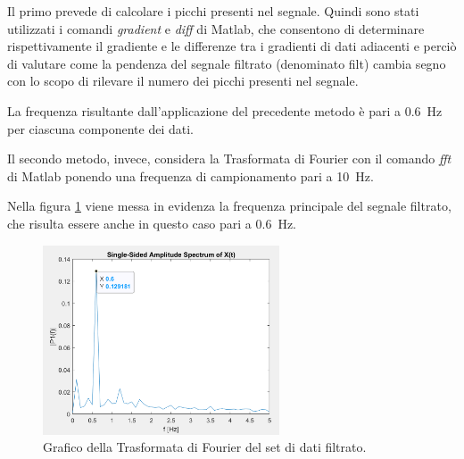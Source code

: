 Il primo prevede di calcolare i picchi presenti nel segnale. Quindi sono stati utilizzati i comandi \textit{gradient} e \textit{diff} di Matlab, che consentono di determinare rispettivamente il gradiente e le differenze tra i gradienti di dati adiacenti e perciò di valutare come la pendenza del segnale filtrato (denominato filt) cambia segno con lo scopo di rilevare il numero dei picchi presenti nel segnale.


La frequenza risultante dall'applicazione del precedente metodo è pari a \SI{0.6}{\hertz} per ciascuna componente dei dati.

Il secondo metodo, invece, considera la Trasformata di Fourier con il comando \textit{fft} di Matlab ponendo una frequenza di campionamento pari a \SI{10}{\hertz}.


Nella figura \ref{fig:plot_fft} viene messa in evidenza la frequenza principale del segnale filtrato, che risulta essere anche in questo caso pari a \SI{0.6}{\hertz}.
\begin{figure}[tbh]
	\centering		\includegraphics[width=7cm]{./ImageFiles/plot2_arr2.png}
	\caption{Grafico della Trasformata di Fourier del set di dati filtrato.}
	\label{fig:plot_fft}
\end{figure}